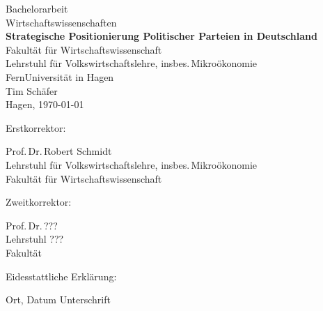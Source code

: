 \documentclass[twoside,12pt,a4paper]{report}
\begin{document}
 
\begin{titlepage}
 \begin{center}
  {\huge Bachelorarbeit\\Wirtschaftswissenschaften\\[1.5cm]}
  {\huge\bf Strategische Positionierung Politischer Parteien in Deutschland\\[3cm]}
  {\large Fakultät für Wirtschaftswissenschaft\\}
  {\large Lehrstuhl für Volkswirtschaftslehre, insbes.\,Mikroökonomie\\[1cm]}
  {\large FernUniversität in Hagen\\[3.5cm]}
  {\large Tim Schäfer\\[3cm]}
  {Hagen, \today} %
  \end{center}
\end{titlepage}


\thispagestyle{empty}
\vspace*{\fill}
\begin{minipage}{\textwidth}
\parbox[t][2cm][t]{3.5cm}{Erstkorrektor:}\hfill
\parbox[t][2cm][t]{10.5cm}{
	Prof.\,Dr.\,Robert Schmidt \\
	Lehrstuhl für Volkswirtschaftslehre, insbes.\,Mikroökonomie\\
	Fakultät für Wirtschaftswissenschaft
}
\parbox[t][2cm][t]{3.5cm}{Zweitkorrektor:}\hfill
\parbox[t][2cm][t]{10.5cm}{ %
	Prof.\,Dr.\,???\\
	Lehrstuhl ???\\
	Fakultät
}

Eidesstattliche Erklärung:

\vskip 2cm

Ort, Datum	\hfill Unterschrift \hfill 
\end{minipage}
\newpage


\setcounter{page}{1}

\end{document}
